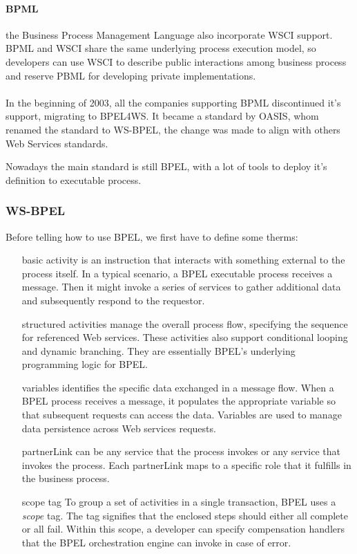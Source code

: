 \documentclass[12pt,a4paper]{article}
\begin{document}
\paragraph{BPML} 
the Business Process Management Language also incorporate WSCI support. BPML and WSCI share the same underlying process execution model, so developers can use WSCI to describe public interactions among business process and reserve PBML for developing private implementations.\\ \\

In the beginning of 2003, all the companies supporting BPML discontinued it's support, migrating to BPEL4WS. It became a standard by OASIS, whom renamed the standard to WS-BPEL, the change was made to align with others Web Services standards.

Nowadays the main standard is still BPEL, with a lot of tools to deploy it's definition to executable process.

\subsubsection{WS-BPEL}
Before telling how to use BPEL, we first have to define some therms:
\begin{itemize}
\item[basic activity] is an instruction that interacts with something external to the process itself. In a typical scenario, a BPEL executable process receives a message. Then it might invoke a series of services to gather additional data and subsequently respond to the requestor.

\item[structured activities] manage the overall process flow, specifying the sequence for referenced Web services. These activities also support conditional looping and dynamic branching. They are essentially BPEL’s underlying programming logic for BPEL. 

\item[variables] identifies the specific data exchanged in a message flow. When a BPEL process receives a message, it populates the appropriate variable so that subsequent requests can access the data. Variables are used to manage data persistence across Web services requests.

\item[partnerLink] can be any service that the process invokes or any service that invokes the process. Each partnerLink maps to a specific role that it fulfills in the business process.

\item[scope tag] To group a set of activities in a single transaction, BPEL uses a \emph{scope} tag. The tag signifies that the enclosed steps should either all complete or all fail. Within this scope, a developer can specify compensation handlers that the BPEL orchestration engine can invoke in case of error.
\end{itemize}
\end{document}
